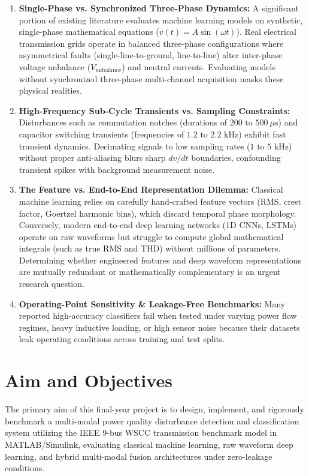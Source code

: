 \documentclass[12pt,a4paper]{report}
\begin{document}
\begin{enumerate}
    \item \textbf{Single-Phase vs. Synchronized Three-Phase Dynamics:} A significant portion of existing literature evaluates machine learning models on synthetic, single-phase mathematical equations ($v(t) = A\sin(\omega t)$). Real electrical transmission grids operate in balanced three-phase configurations where asymmetrical faults (single-line-to-ground, line-to-line) alter inter-phase voltage unbalance ($V_{\text{unbalance}}$) and neutral currents. Evaluating models without synchronized three-phase multi-channel acquisition masks these physical realities.
    \item \textbf{High-Frequency Sub-Cycle Transients vs. Sampling Constraints:} Disturbances such as commutation notches (durations of $200\text{ to }500\ \mu\text{s}$) and capacitor switching transients (frequencies of $1.2\text{ to }2.2\text{ kHz}$) exhibit fast transient dynamics. Decimating signals to low sampling rates ($1\text{ to }5\text{ kHz}$) without proper anti-aliasing blurs sharp $dv/dt$ boundaries, confounding transient spikes with background measurement noise.
    \item \textbf{The Feature vs. End-to-End Representation Dilemma:} Classical machine learning relies on carefully hand-crafted feature vectors (RMS, crest factor, Goertzel harmonic bins), which discard temporal phase morphology. Conversely, modern end-to-end deep learning networks (1D CNNs, LSTMs) operate on raw waveforms but struggle to compute global mathematical integrals (such as true RMS and THD) without millions of parameters. Determining whether engineered features and deep waveform representations are mutually redundant or mathematically complementary is an urgent research question.
    \item \textbf{Operating-Point Sensitivity \& Leakage-Free Benchmarks:} Many reported high-accuracy classifiers fail when tested under varying power flow regimes, heavy inductive loading, or high sensor noise because their datasets leak operating conditions across training and test splits.
\end{enumerate}

\section{Aim and Objectives}
The primary aim of this final-year project is to design, implement, and rigorously benchmark a multi-modal power quality disturbance detection and classification system utilizing the IEEE 9-bus WSCC transmission benchmark model in MATLAB/Simulink, evaluating classical machine learning, raw waveform deep learning, and hybrid multi-modal fusion architectures under zero-leakage conditions.
\end{document}
